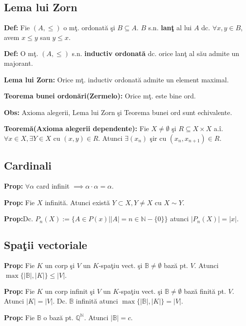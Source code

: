 \documentclass{article}
\begin{document}
\subsection{Lema lui Zorn}

\textbf{Def:} Fie $(A,\leq)$ o m\c t. ordonat\u a \c si $B\subseteq A$. $B$ s.n. \textbf{lan\c t} al lui $A$ dc. $\forall x,y\in B$, avem $x\leq y$ sau $y\leq x$.

\textbf{Def:} O m\c t. $(A,\leq)$ s.n. \textbf{inductiv ordonat\u a} dc. orice lan\c t al s\u au admite un majorant.

\textbf{Lema lui Zorn:} Orice m\c t. inductiv ordonat\u a admite un element maximal.

\textbf{Teorema bunei ordon\u ari(Zermelo):} Orice m\c t. este bine ord.

\textbf{Obs:} Axioma alegerii, Lema lui Zorn \c si Teorema bunei ord sunt echivalente.

\textbf{Teorem\u a(Axioma alegerii dependente):} Fie $X\neq \emptyset$ \c si $R\subseteq X\times X$ a.\^ i. $\forall x\in X, \exists Y\in X$ cu $(x,y)\in R$. Atunci $\exists (x_n)$ \c sir cu $(x_n,x_{n+1})\in R$.

\subsection{Cardinali}

\textbf{Prop:} $\forall \alpha$ card infinit $\implies \alpha\cdot\alpha=\alpha$.

\textbf{Prop:} Fie $X$ infinit\u a. Atunci exist\u a $Y\subset X, Y\neq X$ cu $X\sim Y$.

\textbf{Prop:}Dc. $P_n(X):=\{A\in P(x)||A|=n \in \mathbb N-\{0\}\}$ atunci $|P_n(X)|=|x|$.

\subsection{Spa\c tii vectoriale}

\textbf{Prop:} Fie $K$ un corp \c si $V$ un $K$-spa\c tiu vect. \c si $\mathbb B\neq \emptyset$ baz\u a pt. $V$. Atunci $\max\{|\mathbb B|,|K|\}\leq |V|$.

\textbf{Prop:}  Fie $K$ un corp infinit \c si $V$ un $K$-spa\c tiu vect. \c si $\mathbb B\neq \emptyset$ baz\u a finit\u a pt. $V$. Atunci $|K| = |V|$. Dc. $\mathbb B$ infinit\u a atunci $\max\{|\mathbb B|,|K|\}= |V|$.

\textbf{Prop:} Fie $\mathbb B$ o baz\u a pt. $\mathbb Q^\mathbb N$. Atunci $|\mathbb B|=c$.
\end{document}
